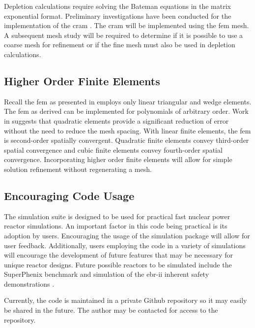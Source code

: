     Depletion calculations require solving the Bateman equations in the matrix
    exponential format. Preliminary investigations have been conducted for the
    implementation of the \gls{cram} \cite{cram}. The \gls{cram} will be
    implemented using the \gls{fem} mesh. A subsequent mesh study will be
    required to determine if it is possible to use a coarse mesh for refinement
    or if the fine mesh must also be used in depletion calculations.

  \subsection{Higher Order Finite Elements}
    Recall the \gls{fem} as presented in  employs
    only linear triangular and wedge elements. The \gls{fem} as derived can be
    implemented for polynomials of arbitrary order. Work in \cite{Hosseini2013} 
    suggests that quadratic elements provide a significant reduction of error
    without the need to reduce the mesh spacing. With linear finite elements,
    the \gls{fem} is second-order spatially convergent. Quadratic finite
    elements convey third-order spatial convergence and cubic finite elements
    convey fourth-order spatial convergence. Incorporating higher order finite
    elements will allow for simple solution refinement without regenerating a
    mesh.

  \subsection{Encouraging Code Usage}
    The simulation suite is designed to be used for practical fast nuclear power
    reactor simulations. An important factor in this code being practical is its
    adoption by users. Encouraging the usage of the simulation package will
    allow for user feedback. Additionally, users employing the code in a variety
    of simulations will encourage the development of future features that may be
    necessary for unique reactor designs. Future possible reactors to be 
    simulated include the SuperPhenix benchmark and simulation of the
    \gls{ebr-ii} inherent safety demonstrations \cite{ebriitests}.
    
    \renewcommand{\thefootnote}{\fnsymbol{footnote}}
    Currently, the code is maintained in a private Github repository so it may 
    easily be shared in the future. The author may be contacted\footnotemark 
    for access to the repository. 


